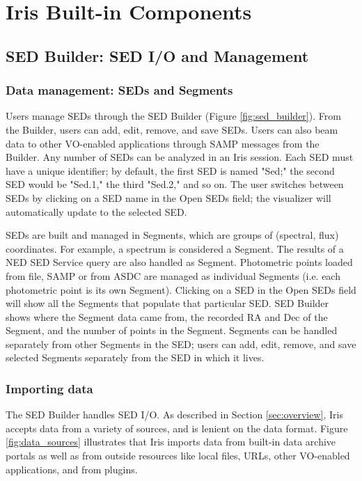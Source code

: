 \section{Iris Built-in Components}
\label{sec:components}

\subsection{SED Builder: SED I/O and Management}
\subsubsection{Data management: SEDs and Segments}
Users manage SEDs through the SED Builder (Figure \ref{fig:sed_builder}). From the Builder, users can add, edit, remove, and save SEDs. Users can also beam data to other VO-enabled applications through SAMP messages from the Builder. Any number of SEDs can be analyzed in an Iris session. Each SED must have a unique identifier; by default, the first SED is named "Sed;" the second SED would be "Sed.1," the third "Sed.2," and so on. The user switches between SEDs by clicking on a SED name in the Open SEDs field; the visualizer will automatically update to the selected SED. 

SEDs are built and managed in Segments, which are groups of (spectral, flux) coordinates. For example, a spectrum is considered a Segment. The results of a NED SED Service query are also handled as Segment. Photometric points loaded from file, SAMP or from ASDC are managed as individual Segments (i.e. each photometric point is its own Segment). Clicking on a SED in the Open SEDs field will show all the Segments that populate that particular SED. SED Builder shows where the Segment data came from, the recorded RA and Dec of the Segment, and the number of points in the Segment. Segments can be handled separately from other Segments in the SED; users can add, edit, remove, and save selected Segments separately from the SED in which it lives. 

\subsubsection{Importing data}
The SED Builder handles SED I/O. As described in Section \ref{sec:overview}, Iris accepts data from a variety of sources, and is lenient on the data format. Figure \ref{fig:data_sources} illustrates that Iris imports data from built-in data archive portals as well as from outside resources like local files, URLs, other VO-enabled applications, and from plugins.


